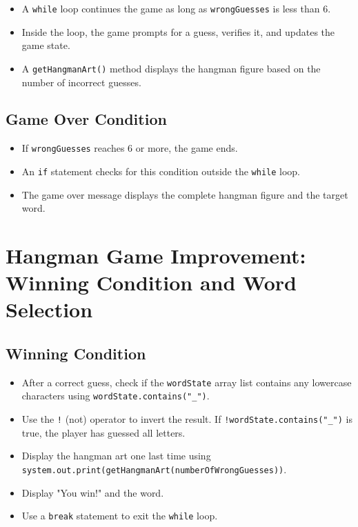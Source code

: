 \documentclass{article}
\begin{document}
\begin{itemize}
\begin{itemize}
    \item A \texttt{while} loop continues the game as long as \texttt{wrongGuesses} is less than 6.
    \item Inside the loop, the game prompts for a guess, verifies it, and updates the game state.
    \item A \texttt{getHangmanArt()} method displays the hangman figure based on the number of incorrect guesses.
\end{itemize}

\subsection*{Game Over Condition}

\begin{itemize}
    \item If \texttt{wrongGuesses} reaches 6 or more, the game ends.
    \item An \texttt{if} statement checks for this condition outside the \texttt{while} loop.
    \item The game over message displays the complete hangman figure and the target word.
\end{itemize}


\section{Hangman Game Improvement: Winning Condition and Word Selection}

\subsection{Winning Condition}

\begin{itemize}
    \item After a correct guess, check if the \texttt{wordState} array list contains any lowercase characters using \texttt{wordState.contains("_")}.
    \item Use the \texttt{!} (not) operator to invert the result. If \texttt{!wordState.contains("_")} is true, the player has guessed all letters.
    \item Display the hangman art one last time using \texttt{system.out.print(getHangmanArt(numberOfWrongGuesses))}.
    \item Display "You win!" and the word.
    \item Use a \texttt{break} statement to exit the \texttt{while} loop.
\end{itemize}



\end{itemize}
\end{document}

